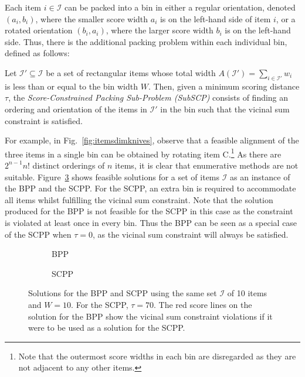 \documentclass[authoryear]{elsarticle}
\begin{document}
\noindent Each item $i \in \mathcal{I}$ can be packed into a bin in either a regular orientation, denoted $(a_i, b_i)$, where the smaller score width $a_i$ is on the left-hand side of item $i$, or a rotated orientation $(b_i, a_i)$, where the larger score width $b_i$ is on the left-hand side. Thus, there is the additional packing problem within each individual bin, defined as follows:

\begin{definition}
	Let $\mathcal{I}' \subseteq \mathcal{I}$ be a set of rectangular items whose total width $A(\mathcal{I}') = \sum_{i \in \mathcal{I}'} w_i$ is less than or equal to the bin width $W$. Then, given a minimum scoring distance $\tau$, the \emph{Score-Constrained Packing Sub-Problem (SubSCP)} consists of finding an ordering and orientation of the items in $\mathcal{I}'$ in the bin such that the vicinal sum constraint is satisfied.
	\label{defn:subscp}
\end{definition}


\noindent For example, in Fig.~\ref{fig:itemsdimknives}, observe that a feasible alignment of the three items in a single bin can be obtained by rotating item C.\footnote{Note that the outermost score widths in each bin are disregarded as they are not adjacent to any other items.} As there are $2^{n-1} n!$ distinct orderings of $n$ items, it is clear that enumerative methods are not suitable. Figure~\ref{fig:bppvscpp} shows feasible solutions for a set of items $\mathcal{I}$ as an instance of the BPP and the SCPP. For the SCPP, an extra bin is required to accommodate all items whilst fulfilling the vicinal sum constraint. Note that the solution produced for the BPP is not feasible for the SCPP in this case as the constraint is violated at least once in every bin. Thus the BPP can be seen as a special case of the SCPP when $\tau=0$, as the vicinal sum constraint will always be satisfied.

\begin{figure}[H]
	\centering	
	\begin{subfigure}[h]{0.37\textwidth}
		
		\caption{BPP}
		\label{fig:bpp}
	\end{subfigure} \hspace{15mm}
	\begin{subfigure}[h]{0.37\textwidth}
		
		\caption{SCPP}
		\label{fig:scpp}
	\end{subfigure}
	\caption{Solutions for the BPP and SCPP using the same set $\mathcal{I}$ of 10 items and $W = 10$. For the SCPP, $\tau = 70$. The red score lines on the solution for the BPP show the vicinal sum constraint violations if it were to be used as a solution for the SCPP.}	
	\label{fig:bppvscpp}
\end{figure}
\end{document}
